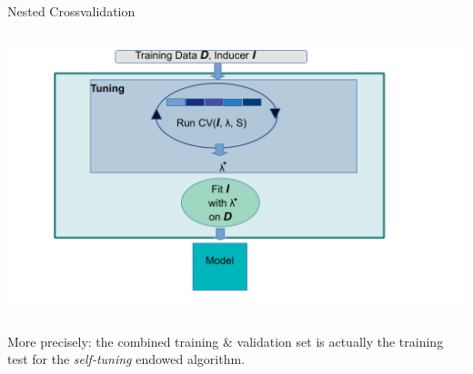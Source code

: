 \begin{frame}{Nested Crossvalidation}
\begin{columns}[c, onlytextwidth]
\hspace*{-0.7cm}
\begin{center}
\includegraphics[width=1.2\textwidth]{images/autotune_in_model_fit.pdf}
\end{center}
\end{columns}

\framebreak

More precisely: the combined training \& validation set is actually the training test for the \textit{self-tuning} endowed algorithm.


\end{frame}
